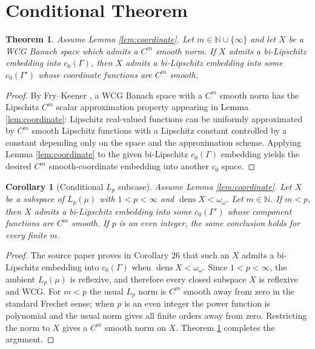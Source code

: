 \documentclass[11pt]{article}
\newtheorem{theorem}{Theorem}
\newtheorem{corollary}{Corollary}
\newcommand{\dens}{\operatorname{dens}}
\begin{document}
\section*{Conditional Theorem}

\begin{theorem}\label{thm:wcg}
Assume Lemma \ref{lem:coordinate}.  Let $m\in\mathbb N\cup\{\infty\}$ and let
$X$ be a WCG Banach space which admits a $C^m$ smooth norm.  If $X$ admits a
bi-Lipschitz embedding into $c_0(\Gamma)$, then $X$ admits a bi-Lipschitz
embedding into some $c_0(\Gamma')$ whose coordinate functions are $C^m$ smooth.
\end{theorem}

\begin{proof}
By Fry--Keener \cite{FryKeener09070241}, a WCG Banach space with a $C^m$
smooth norm has the Lipschitz $C^m$ scalar approximation property appearing in
Lemma \ref{lem:coordinate}: Lipschitz real-valued functions can be uniformly
approximated by $C^m$ smooth Lipschitz functions with a Lipschitz constant
controlled by a constant depending only on the space and the approximation
scheme.  Applying Lemma \ref{lem:coordinate} to the given bi-Lipschitz
$c_0(\Gamma)$ embedding yields the desired $C^m$ smooth-coordinate embedding
into another $c_0$ space.
\end{proof}

\begin{corollary}[Conditional $L_p$ subcase]\label{cor:lp}
Assume Lemma \ref{lem:coordinate}.  Let $X$ be a subspace of $L_p(\mu)$ with
$1<p<\infty$ and $\dens X<\omega_\omega$.  Let $m\in\mathbb N$.  If $m<p$,
then $X$ admits a bi-Lipschitz embedding into some $c_0(\Gamma')$ whose
component functions are $C^m$ smooth.  If $p$ is an even integer, the same
conclusion holds for every finite $m$.
\end{corollary}

\begin{proof}
The source paper proves in Corollary 26 that such an $X$ admits a
bi-Lipschitz embedding into $c_0(\Gamma)$ when $\dens X<\omega_\omega$.
Since $1<p<\infty$, the ambient $L_p(\mu)$ is reflexive, and therefore every
closed subspace $X$ is reflexive and WCG.  For $m<p$ the usual $L_p$ norm is
$C^m$ smooth away from zero in the standard Frechet sense; when $p$ is an even
integer the power function is polynomial and the usual norm gives all finite
orders away from zero.  Restricting the norm to $X$ gives a $C^m$ smooth norm
on $X$.  Theorem \ref{thm:wcg} completes the argument.
\end{proof}
\end{document}
